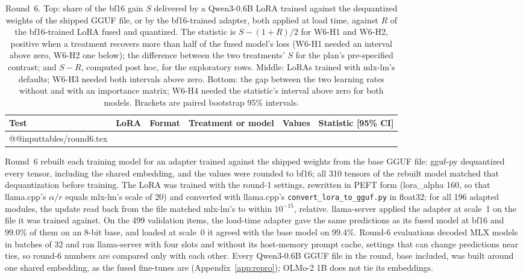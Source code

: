 \documentclass[10pt]{article}
\makeatletter
\newcommand*{\tablerows}[1]{\csname @@input\endcsname #1 }
\makeatother
\begin{document}
\begin{table}[htbp]
\centering\footnotesize
\caption{Round~6. Top: share of the bf16 gain $S$ delivered by a Qwen3-0.6B LoRA trained against the dequantized weights of the shipped GGUF file, or by the bf16-trained adapter, both applied at load time, against $R$ of the bf16-trained LoRA fused and quantized. The statistic is $S - (1 + R)/2$ for W6-H1 and W6-H2, positive when a treatment recovers more than half of the fused model's loss (W6-H1 needed an interval above zero, W6-H2 one below); the difference between the two treatments' $S$ for the plan's pre-specified contrast; and $S - R$, computed post hoc, for the exploratory rows. Middle: LoRAs trained with mlx-lm's defaults; W6-H3 needed both intervals above zero. Bottom: the gap between the two learning rates without and with an importance matrix; W6-H4 needed the statistic's interval above zero for both models. Brackets are paired bootstrap 95\% intervals.}
\label{tab:round6}
\begin{tabular}{llllll}
\toprule
Test & LoRA & Format & Treatment or model & Values & Statistic [95\% CI] \\
\midrule
\tablerows{tables/round6.tex}
\bottomrule
\end{tabular}
\end{table}

Round~6 rebuilt each training model for an adapter trained against the shipped weights from the base GGUF file: gguf-py dequantized every tensor, including the shared embedding, and the values were rounded to bf16; all 310 tensors of the rebuilt model matched that dequantization before training. The LoRA was trained with the round-1 settings, rewritten in PEFT form (lora\_alpha 160, so that llama.cpp's $\alpha/r$ equals mlx-lm's scale of 20) and converted with llama.cpp's \texttt{convert\_lora\_to\_gguf.py} in float32; for all 196 adapted modules, the update read back from the file matched mlx-lm's to within $10^{-15}$, relative. llama-server applied the adapter at scale~1 on the file it was trained against. On the 499 validation items, the load-time adapter gave the same predictions as its fused model at bf16 and 99.0\% of them on an 8-bit base, and loaded at scale~0 it agreed with the base model on 99.4\%. Round-6 evaluations decoded MLX models in batches of 32 and ran llama-server with four slots and without its host-memory prompt cache, settings that can change predictions near ties, so round-6 numbers are compared only with each other. Every Qwen3-0.6B GGUF file in the round, base included, was built around one shared embedding, as the fused fine-tunes are (Appendix~\ref{app:repro}); OLMo-2 1B does not tie its embeddings.
\end{document}
